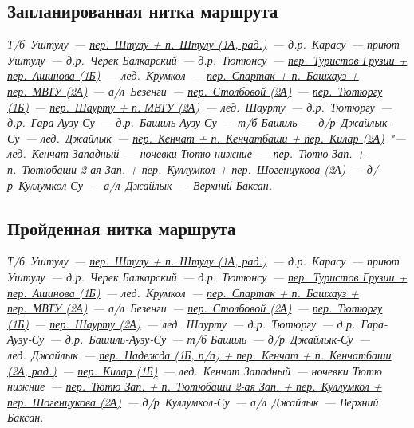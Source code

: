 	\subsection{Запланированная нитка маршрута}\label{subsec:planned_route}
		\renewcommand{\bfdefault}{bx}
		\textit{
			Т/б~Уштулу~---
			\hyperref[subsec:main_obstacles]{пер.~Штулу + п.~Штулу (1А, рад.)}~---
			д.р.~Карасу~---
			приют Уштулу~---
			д.р.~Черек Балкарский~---
			д.р.~Тютюнсу~---
			\hyperref[subsec:main_obstacles]{пер.~Туристов Грузии + пер.~Ашинова (1Б)}~---
			лед.~Крумкол~---
			\hyperref[subsec:main_obstacles]{пер.~Спартак + п.~Башхауз + пер.~МВТУ (2А)}~---
			а/л~Безенги~---
			\hyperref[subsec:main_obstacles]{пер.~Столбовой (2А)}~---
			\hyperref[subsec:main_obstacles]{пер.~Тютюргу (1Б)}~---
			\hyperref[subsec:main_obstacles]{пер.~Шаурту + п. МВТУ (2А)}~---
			лед.~Шаурту~---
			д.р.~Тютюргу~---
			д.р.~Гара-Аузу-Су~---
			д.р.~Башиль-Аузу-Су~---
			т/б Башиль~---
			д/р~Джайлык-Су~---
			лед.~Джайлык~---
			\hyperref[subsec:main_obstacles]{пер.~Кенчат + п.~Кенчатбаши + пер.~Килар (2А)}~"---
			лед.~Кенчат Западный~---
			ночевки Тютю нижние~---
			\hyperref[subsec:main_obstacles]{пер.~Тютю Зап. + п.~Тютюбаши 2-ая Зап. + пер.~Куллумкол + пер.~Шогенцукова (2А)}~---
			д/р~Куллумкол-Су~---
			а/л~Джайлык~---
			Верхний Баксан.
			}
	
	\subsection{Пройденная нитка маршрута}\label{subsec:real_route}
		\textit{
			Т/б~Уштулу~---
			\hyperref[subsec:main_obstacles]{пер.~Штулу + п.~Штулу (1А, рад.)}~---
			д.р.~Карасу~---
			приют Уштулу~---
			д.р.~Черек Балкарский~---
			д.р.~Тютюнсу~---
			\hyperref[subsec:main_obstacles]{пер.~Туристов Грузии + пер.~Ашинова (1Б)}~---
			лед.~Крумкол~---
			\hyperref[subsec:main_obstacles]{пер.~Спартак + п.~Башхауз + пер.~МВТУ (2А)}~---
			а/л~Безенги~---
			\hyperref[subsec:main_obstacles]{пер.~Столбовой (2А)}~---
			\hyperref[subsec:main_obstacles]{пер.~Тютюргу (1Б)}~---
			\hyperref[subsec:main_obstacles]{пер.~Шаурту (2А)}~---
			лед.~Шаурту~---
			д.р.~Тютюргу~---
			д.р.~Гара-Аузу-Су~---
			д.р.~Башиль-Аузу-Су~---
			т/б Башиль~---
			д/р~Джайлык-Су~---
			лед.~Джайлык~---
			\hyperref[subsec:main_obstacles]{пер.~Надежда (1Б, п/п) + пер.~Кенчат + п.~Кенчатбаши (2А, рад.)}~---
			\hyperref[subsec:main_obstacles]{пер.~Килар (1Б)}~---
			лед.~Кенчат Западный~---
			ночевки Тютю нижние~---
			\hyperref[subsec:main_obstacles]{пер.~Тютю Зап. + п.~Тютюбаши 2-ая Зап. + пер.~Куллумкол + пер.~Шогенцукова (2А)}~---
			д/р~Куллумкол-Су~---
			а/л~Джайлык~---
			Верхний Баксан.
			}
		\renewcommand{\bfdefault}{b}

